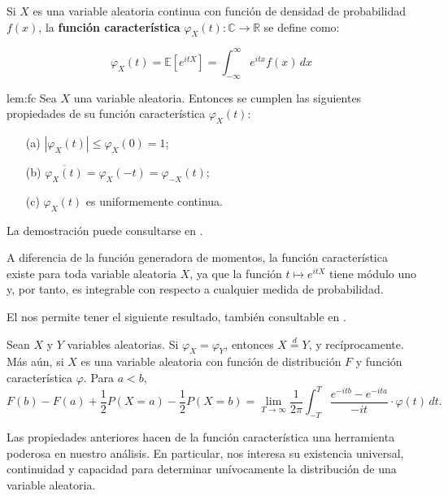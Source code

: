 \documentclass[../Main.tex]{subfiles}
\begin{document}
\begin{definition}{}{}
    Si \( X \) es una variable aleatoria continua con función de densidad de probabilidad \( f(x) \), la \textbf{función característica} \( \varphi_X(t) :\mathbb{C}\rightarrow\mathbb{R}\) se define como:

\[
\varphi_X(t) = \mathbb{E}[e^{itX}] = \int_{-\infty}^{\infty} e^{itx} f(x) \, dx
\]

\end{definition}
\begin{lemma}{}{lem:fc}
    Sea \( X \) una variable aleatoria. Entonces se cumplen las siguientes propiedades de su función característica \( \varphi_X(t) \):
\begin{enumerate}
    \item[(a)] \( \left| \varphi_X(t) \right| \le \varphi_X(0) = 1 \);
    \item[(b)] \( \overline{\varphi_X(t)} = \varphi_X(-t) = \varphi_{-X}(t) \);
    \item[(c)] \( \varphi_X(t) \) es uniformemente continua.
\end{enumerate}
La demostración puede consultarse en \cite{gut2013probability}.
\end{lemma}
\begin{remark}{}{}
     A diferencia de la función generadora de momentos, la función característica existe para toda variable aleatoria \( X \), ya que la función \( t \mapsto e^{itX} \) tiene módulo uno y, por tanto, es integrable con respecto a cualquier medida de probabilidad. 
\end{remark}
El  nos permite tener el siguiente resultado, también consultable en \cite{gut2013probability}.
\begin{theorem}{}{}
Sean \( X \) y \( Y \) variables aleatorias. Si \( \varphi_X = \varphi_Y \), entonces \( X \overset{d}{=} Y \), y recíprocamente. 
Más aún, si \( X \) es una variable aleatoria con función de distribución \( F \) y función característica \( \varphi \). Para \( a < b \),
\[
F(b) - F(a) + \frac{1}{2} P(X = a) - \frac{1}{2} P(X = b)
= \lim_{T \to \infty} \frac{1}{2\pi} \int_{-T}^{T}
\frac{e^{-itb} - e^{-ita}}{-it} \cdot \varphi(t)\, dt.
\]
\label{teo:fc}
\end{theorem}

Las propiedades anteriores hacen de la función característica una herramienta poderosa en nuestro análisis. En particular, nos interesa su existencia universal, continuidad y capacidad para determinar unívocamente la distribución de una variable aleatoria.
 
\end{document}
